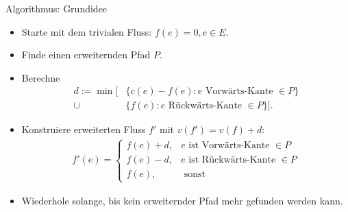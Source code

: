 \documentclass[aspectratio=169]{beamer}
\begin{document}
  \begin{frame}{Algorithmus: Grundidee}

  \begin{algorithmus*}
    \begin{itemize}
      \item<1-> Starte mit dem trivialen Fluss: $f(e) = 0 , e \in E$.
      \item<2-> Finde einen erweiternden Pfad $P$.
      \item<3-> Berechne
      \begin{align*}
        d := \min[&\{c(e) - f(e): e \text{ Vorwärts-Kante } \in P\} \\ \cup
        &\{f(e): e \text{ Rückwärts-Kante } \in P\} ].
      \end{align*}
      \item<4-> Konstruiere erweiterten Fluss $f'$ mit $v(f') = v(f) + d$:
      \begin{align*}
        f'(e) = \begin{cases}
          f(e) + d, & e \text{ ist Vorwärts-Kante } \in P \\
          f(e) - d, & e \text{ ist Rückwärts-Kante } \in P\\
          f(e), & \text{ sonst}
        \end{cases}
      \end{align*}
      \item<5-> Wiederhole solange, bis kein erweiternder Pfad mehr gefunden werden kann.
    \end{itemize}
  \end{algorithmus*}

  \end{frame}
\end{document}
